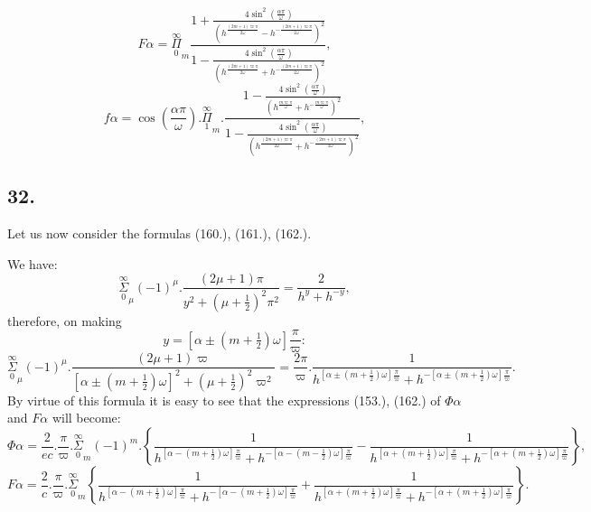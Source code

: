 \documentclass{article}
\begin{document}
\[
F\alpha = \overset{\infty}{\underset{0}{\Pi}}_{m}\frac{1+\frac{4\sin^{2}\left(\frac{\alpha\pi}{\omega}\right)}{\left(h^{\frac{(2m+1)\varpi\pi}{2\omega}}-h^{-\frac{(2m+1)\varpi\pi}{2\omega}}\right)^{2}}}{1-\frac{4\sin^{2}\left(\frac{\alpha\pi}{\omega}\right)}{\left(h^{\frac{(2m+1)\varpi\pi}{2\omega}}+h^{-\frac{(2m+1)\varpi\pi}{2\omega}}\right)^{2}}},
\tag{188.}
\]
\[
f\alpha = \cos\left(\frac{\alpha\pi}{\omega}\right).\overset{\infty}{\underset{1}{\Pi}}_{m}.\frac{1-\frac{4\sin^{2}\left(\frac{\alpha\pi}{\omega}\right)}{\left(h^{\frac{m\varpi\pi}{\omega}}+h^{-\frac{m\varpi\pi}{\omega}}\right)^{2}}}{1-\frac{4\sin^{2}\left(\frac{\alpha\pi}{\omega}\right)}{\left(h^{\frac{(2m+1)\varpi\pi}{2\omega}}+h^{-\frac{(2m+1)\varpi\pi}{2\omega}}\right)^{2}}},
\tag{189.}
\]

\subsection*{32.}

Let us now consider the formulas (160.), (161.), (162.).

We have:
\[
\overset{\infty}{\underset{0}{\Sigma}}_{\mu}(-1)^{\mu}.\frac{(2\mu+1)\pi}{y^{2}+(\mu+\tfrac{1}{2})^{2}\pi^{2}} = \frac{2}{h^{y}+h^{-y}},
\]
therefore, on making
\[
y = [\alpha\pm(m+\tfrac{1}{2})\omega]\frac{\pi}{\varpi}:
\]
\[
\overset{\infty}{\underset{0}{\Sigma}}_{\mu}(-1)^{\mu}.\frac{(2\mu+1)\varpi}{[\alpha\pm(m+\tfrac{1}{2})\omega]^{2}+(\mu+\tfrac{1}{2})^{2}\varpi^{2}} = \frac{2\pi}{\varpi}.\frac{1}{h^{[\alpha\pm(m+\frac{1}{2})\omega]\frac{\pi}{\varpi}}+h^{-[\alpha\pm(m+\frac{1}{2})\omega]\frac{\pi}{\varpi}}}.
\]
By virtue of this formula it is easy to see that the expressions (153.), (162.) of $\Phi\alpha$ and $F\alpha$ will become:
\[
\Phi\alpha = \frac{2}{ec}.\frac{\pi}{\varpi}.\overset{\infty}{\underset{0}{\Sigma}}_{m}(-1)^{m}.\left\{\frac{1}{h^{[\alpha-(m+\frac{1}{2})\omega]\frac{\pi}{\varpi}}+h^{-[\alpha-(m-\frac{1}{2})\omega]\frac{\pi}{\varpi}}}-\frac{1}{h^{[\alpha+(m+\frac{1}{2})\omega]\frac{\pi}{\varpi}}+h^{-[\alpha+(m+\frac{1}{2})\omega]\frac{\pi}{\varpi}}}\right\},
\tag{190.}
\]
\[
F\alpha = \frac{2}{c}.\frac{\pi}{\varpi}.\overset{\infty}{\underset{0}{\Sigma}}_{m}\left\{\frac{1}{h^{[\alpha-(m+\frac{1}{2})\omega]\frac{\pi}{\varpi}}+h^{-[\alpha-(m+\frac{1}{2})\omega]\frac{\pi}{\varpi}}}+\frac{1}{h^{[\alpha+(m+\frac{1}{2})\omega]\frac{\pi}{\varpi}}+h^{-[\alpha+(m+\frac{1}{2})\omega]\frac{\pi}{\varpi}}}\right\}.
\tag{191.}
\]
\end{document}
